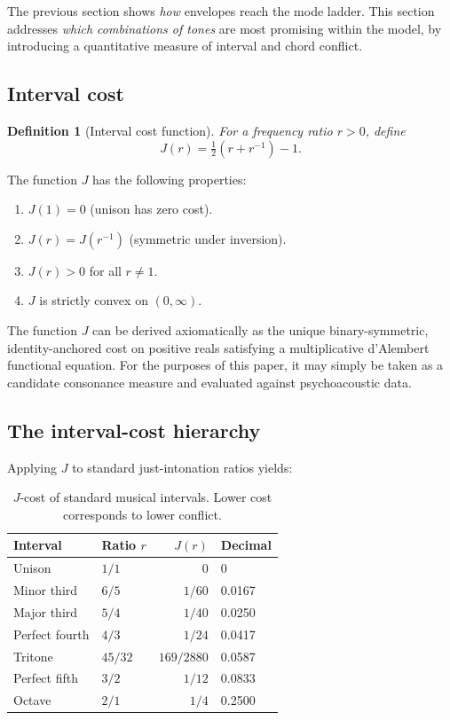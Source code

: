 \documentclass[11pt,a4paper]{article}
\newtheorem{definition}[theorem]{Definition}
\begin{document}
The previous section shows \emph{how} envelopes reach the mode ladder.
This section addresses \emph{which combinations of tones} are
most promising within the model, by introducing a quantitative measure of
interval and chord conflict.

\subsection{Interval cost}

\begin{definition}[Interval cost function]
\label{def:jcost}
For a frequency ratio $r > 0$, define
\begin{equation}
  \label{eq:jcost}
  J(r) = \tfrac{1}{2}\!\left(r + r^{-1}\right) - 1.
\end{equation}
\end{definition}

\noindent The function $J$ has the following properties:
\begin{enumerate}[label=(\roman*)]
  \item $J(1) = 0$ (unison has zero cost).
  \item $J(r) = J(r^{-1})$ (symmetric under inversion).
  \item $J(r) > 0$ for all $r \neq 1$.
  \item $J$ is strictly convex on $(0,\infty)$.
\end{enumerate}

\noindent The function $J$ can be derived axiomatically as the unique
binary-symmetric, identity-anchored cost on positive reals satisfying a
multiplicative d'Alembert functional equation.
For the purposes of this paper, it may simply be taken as a candidate
consonance measure and evaluated against psychoacoustic data.

\subsection{The interval-cost hierarchy}

Applying $J$ to standard just-intonation ratios yields:

\begin{table}[H]
\centering
\caption{$J$-cost of standard musical intervals. Lower cost corresponds
to lower conflict.}
\label{tab:jcost}
\begin{tabular}{@{}llrl@{}}
\toprule
Interval & Ratio $r$ & $J(r)$ & Decimal \\
\midrule
Unison      & $1/1$   & $0$       & 0 \\
Minor third & $6/5$   & $1/60$    & 0.0167 \\
Major third & $5/4$   & $1/40$    & 0.0250 \\
Perfect fourth & $4/3$ & $1/24$   & 0.0417 \\
Tritone     & $45/32$ & $169/2880$& 0.0587 \\
Perfect fifth & $3/2$ & $1/12$    & 0.0833 \\
Octave      & $2/1$   & $1/4$     & 0.2500 \\
\bottomrule
\end{tabular}
\end{table}
\end{document}
